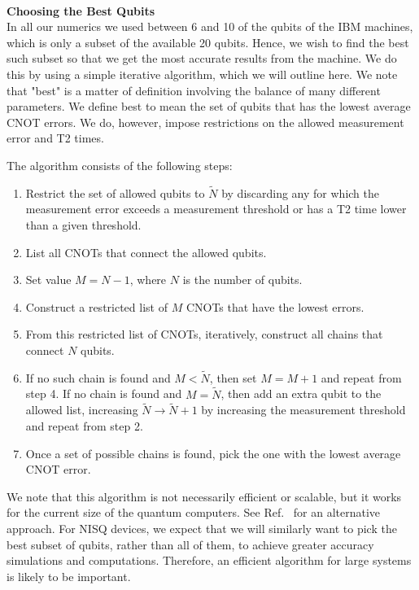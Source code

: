 \documentclass[twocolumn,showpacs,preprintnumbers,nofootinbib,amsmath,aps,pra,longbibliography,amssymb,superscriptaddress]{revtex4-1}
\begin{document}

\hfill\\\textbf{Choosing the Best Qubits}\\
In all our numerics we used between 6 and 10 of the qubits of the IBM machines, which is only a subset of the available 20 qubits. Hence, we wish to find the best such subset so that we get the most accurate results from the machine. We do this by using a simple iterative algorithm, which we will outline here. We note that "best" is a matter of definition involving the balance of many different parameters. We define best to mean the set of qubits that has the lowest average CNOT errors. We do, however, impose restrictions on the allowed measurement error and T2 times.

The algorithm consists of the following steps:
\begin{enumerate}
	\item Restrict the set of allowed qubits to $\tilde{N}$ by discarding any for which the measurement error exceeds a measurement threshold or has a T2 time lower than a given threshold.
	\item List all CNOTs that connect the allowed qubits.
	\item Set value $M = N-1$, where $N$ is the number of qubits.
	\item Construct a restricted list of $M$ CNOTs that have the lowest errors.
	\item From this restricted list of CNOTs, iteratively, construct all chains that connect $N$ qubits.
	\item If no such chain is found and $M<\tilde{N}$, then set $M = M+1$ and repeat from step 4. If no chain is found and $M=\tilde{N}$, then add an extra qubit to the allowed list, increasing $\tilde{N} \rightarrow \tilde{N} + 1$ by increasing the measurement threshold and repeat from step 2.
	\item Once a set of possible chains is found, pick the one with the lowest average CNOT error. 
\end{enumerate}

We note that this algorithm is not necessarily efficient or scalable, but it works for the current size of the quantum computers. See Ref.~\cite{Nishio2019} for an alternative approach. For NISQ devices, we expect that we will similarly want to pick the best subset of qubits, rather than all of them, to achieve greater accuracy simulations and computations. Therefore, an efficient algorithm for large systems is likely to be important.
\end{document}
